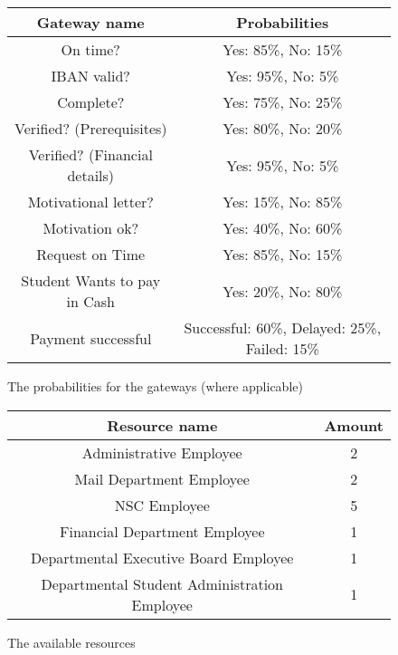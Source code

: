 \begin{figure}[h!]
	\centering
	\begin{tabular}{ | c | c | }
		\hline
		\textbf{Gateway name} & \textbf{Probabilities} \\ \hline\hline
		On time? & Yes: 85\%, No: 15\% \\ \hline
		IBAN valid? & Yes: 95\%, No: 5\% \\ \hline
		Complete? & Yes: 75\%, No: 25\% \\ \hline
		Verified? (Prerequisites) & Yes: 80\%, No: 20\% \\ \hline
		Verified? (Financial details) & Yes: 95\%, No: 5\% \\ \hline
		Motivational letter? & Yes: 15\%, No: 85\% \\ \hline
		Motivation ok? & Yes: 40\%, No: 60\% \\ \hline
		Request on Time & Yes: 85\%, No: 15\% \\ \hline	
		Student Wants to pay in Cash & Yes: 20\%, No: 80\% \\ \hline	
		Payment successful & Successful: 60\%, Delayed: 25\%, Failed: 15\% \\ \hline			
		\hline
	\end{tabular}
	\caption{The probabilities for the gateways (where applicable)}
	\label{fig:probabilities2}
\end{figure}

\begin{figure}[h!]
	\centering
	\begin{tabular}{ | c | c | }
		\hline
		\textbf{Resource name} & \textbf{Amount} \\ \hline\hline
		Administrative Employee & 2 \\ \hline		
		Mail Department Employee & 2 \\ \hline
		NSC Employee & 5 \\ \hline
		Financial Department Employee & 1 \\ \hline
		Departmental Executive Board Employee & 1 \\ \hline
		Departmental Student Administration Employee & 1 \\ \hline
		\hline
	\end{tabular}
	\caption{The available resources}
	\label{fig:resources2}
\end{figure}

